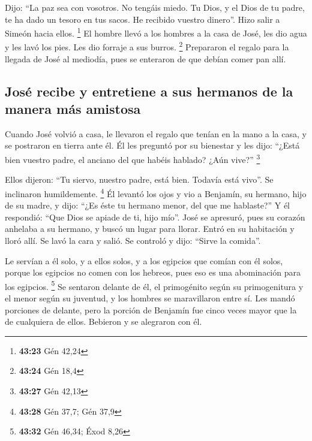 \begin{paracol}{2}
 Dijo: ``La paz sea con vosotros. No tengáis miedo. Tu
Dios, y el Dios de tu padre, te ha dado un tesoro en tus sacos. He
recibido vuestro dinero''. Hizo salir a Simeón hacia ellos. \footnote{\textbf{43:23}
  Gén 42,24}  El hombre llevó a los hombres a la casa de
José, les dio agua y les lavó los pies. Les dio forraje a sus burros.
\footnote{\textbf{43:24} Gén 18,4}  Prepararon el regalo
para la llegada de José al mediodía, pues se enteraron de que debían
comer pan allí.

\hypertarget{josuxe9-recibe-y-entretiene-a-sus-hermanos-de-la-manera-muxe1s-amistosa}{%
\subsection{José recibe y entretiene a sus hermanos de la manera más
amistosa}\label{josuxe9-recibe-y-entretiene-a-sus-hermanos-de-la-manera-muxe1s-amistosa}}

 Cuando José volvió a casa, le llevaron el regalo que
tenían en la mano a la casa, y se postraron en tierra ante él.
 Él les preguntó por su bienestar y les dijo: ``¿Está
bien vuestro padre, el anciano del que habéis hablado? ¿Aún vive?''
\footnote{\textbf{43:27} Gén 42,13}

 Ellos dijeron: ``Tu siervo, nuestro padre, está bien.
Todavía está vivo''. Se inclinaron humildemente. \footnote{\textbf{43:28}
  Gén 37,7; Gén 37,9}  Él levantó los ojos y vio a
Benjamín, su hermano, hijo de su madre, y dijo: ``¿Es éste tu hermano
menor, del que me hablaste?'' Y él respondió: ``Que Dios se apiade de
ti, hijo mío''.  José se apresuró, pues su corazón
anhelaba a su hermano, y buscó un lugar para llorar. Entró en su
habitación y lloró allí.  Se lavó la cara y salió. Se
controló y dijo: ``Sirve la comida''.

 Le servían a él solo, y a ellos solos, y a los egipcios
que comían con él solos, porque los egipcios no comen con los hebreos,
pues eso es una abominación para los egipcios. \footnote{\textbf{43:32}
  Gén 46,34; Éxod 8,26}  Se sentaron delante de él, el
primogénito según su primogenitura y el menor según su juventud, y los
hombres se maravillaron entre sí.  Les mandó porciones de
delante, pero la porción de Benjamín fue cinco veces mayor que la de
cualquiera de ellos. Bebieron y se alegraron con él.

\switchcolumn
\begin{otherlanguage}{english}


\end{otherlanguage}
\end{paracol}
